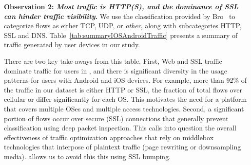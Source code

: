 \noindent\textbf{Observation 2: \emph{Most traffic is HTTP(S), and the dominance of SSL can hinder traffic visibility}.} We use the classification 
provided by Bro~\cite{bro} to categorize flows as either TCP, UDP, or \emph{other}, along with subcategories HTTP, SSL and DNS.
Table~\ref{tab:summaryIOSAndroidTraffic} presents a 
summary of traffic generated by user devices in our study. 

There are two key  
take-aways from this table. First, Web and SSL traffic dominate traffic for users in \mobWild, 
and there is significant diversity in the usage patterns for 
users with Android and iOS devices. For example, more than 92\% of the traffic in our \mobWild dataset is either HTTP or SSL, 
the fraction of total flows over cellular or \wifi differ significantly for each OS. This motivates the need for a platform that covers 
multiple OSes and multiple access technologies. Second, a significant portion of flows occur over secure (SSL) connections 
that generally prevent classification using deep packet inspection. This calls into question 
the overall effectiveness of traffic optimization approaches that rely 
on middlebox technologies that interpose of plaintext traffic (\eg page rewriting or 
downsampling media). \meddle allows us to avoid this this using SSL bumping.

